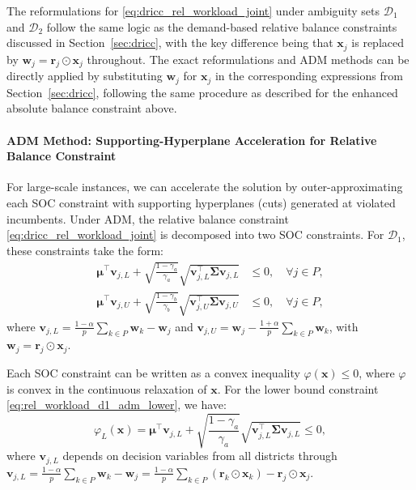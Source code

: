 \documentclass[preprint,12pt,authoryear]{elsarticle}
\begin{document}
The reformulations for \eqref{eq:dricc_rel_workload_joint} under ambiguity sets $\mathcal{D}_1$ and $\mathcal{D}_2$ follow the same logic as the demand-based relative balance constraints discussed in Section~\ref{sec:dricc}, with the key difference being that $\mathbf{x}_j$ is replaced by $\mathbf{w}_j = \mathbf{r}_j \odot \mathbf{x}_j$ throughout. The exact reformulations and ADM methods can be directly applied by substituting $\mathbf{w}_j$ for $\mathbf{x}_j$ in the corresponding expressions from Section~\ref{sec:dricc}, following the same procedure as described for the enhanced absolute balance constraint above.

\paragraph{ADM Method: Supporting-Hyperplane Acceleration for Relative Balance Constraint}
For large-scale instances, we can accelerate the solution by outer-approximating each SOC constraint with supporting hyperplanes (cuts) generated at violated incumbents. Under ADM, the relative balance constraint \eqref{eq:dricc_rel_workload_joint} is decomposed into two SOC constraints. For $\mathcal{D}_1$, these constraints take the form:
\begin{align}
\boldsymbol{\mu}^\top \mathbf{v}_{j,L} + \sqrt{\frac{1-\gamma_a}{\gamma_a}} \sqrt{\mathbf{v}_{j,L}^\top \boldsymbol{\Sigma} \mathbf{v}_{j,L}} &\leqslant 0, \quad \forall j \in P, \label{eq:rel_workload_d1_adm_lower} \\
\boldsymbol{\mu}^\top \mathbf{v}_{j,U} + \sqrt{\frac{1-\gamma_b}{\gamma_b}} \sqrt{\mathbf{v}_{j,U}^\top \boldsymbol{\Sigma} \mathbf{v}_{j,U}} &\leqslant 0, \quad \forall j \in P, \label{eq:rel_workload_d1_adm_upper}
\end{align}
where $\mathbf{v}_{j,L} = \frac{1-\alpha}{p} \sum_{k \in P} \mathbf{w}_k - \mathbf{w}_j$ and $\mathbf{v}_{j,U} = \mathbf{w}_j - \frac{1+\alpha}{p} \sum_{k \in P} \mathbf{w}_k$, with $\mathbf{w}_j = \mathbf{r}_j \odot \mathbf{x}_j$.

Each SOC constraint can be written as a convex inequality $\varphi(\mathbf{x}) \leqslant 0$, where $\varphi$ is convex in the continuous relaxation of $\mathbf{x}$. For the lower bound constraint \eqref{eq:rel_workload_d1_adm_lower}, we have:
\begin{equation}
\varphi_L(\mathbf{x}) = \boldsymbol{\mu}^\top \mathbf{v}_{j,L} + \sqrt{\frac{1-\gamma_a}{\gamma_a}} \sqrt{\mathbf{v}_{j,L}^\top \boldsymbol{\Sigma} \mathbf{v}_{j,L}} \leqslant 0,
\label{eq:rel_workload_phi_L}
\end{equation}
where $\mathbf{v}_{j,L}$ depends on decision variables from all districts through $\mathbf{v}_{j,L} = \frac{1-\alpha}{p} \sum_{k \in P} \mathbf{w}_k - \mathbf{w}_j = \frac{1-\alpha}{p} \sum_{k \in P} (\mathbf{r}_k \odot \mathbf{x}_k) - \mathbf{r}_j \odot \mathbf{x}_j$.
\end{document}
